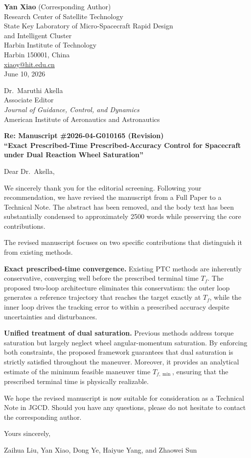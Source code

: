 \documentclass[12pt]{article}
\begin{document}
\begin{flushright}
\textbf{Yan Xiao} (Corresponding Author)\\
Research Center of Satellite Technology\\
State Key Laboratory of Micro-Spacecraft Rapid Design\\
and Intelligent Cluster\\
Harbin Institute of Technology\\
Harbin 150001, China\\
\href{mailto:xiaoy@hit.edu.cn}{xiaoy@hit.edu.cn}\\[6pt]
June 10, 2026
\end{flushright}

\bigskip

Dr.\ Maruthi Akella\\
Associate Editor\\
\textit{Journal of Guidance, Control, and Dynamics}\\
American Institute of Aeronautics and Astronautics

\bigskip

\textbf{Re: Manuscript \#2026-04-G010165 (Revision)}\\[4pt]
\textbf{``Exact Prescribed-Time Prescribed-Accuracy Control for Spacecraft
under Dual Reaction Wheel Saturation''}

\bigskip

Dear Dr.\ Akella,

We sincerely thank you for the editorial screening. Following your
recommendation, we have revised the manuscript from a Full Paper to a
Technical Note. The abstract has been removed, and the body text has been
substantially condensed to approximately 2500 words while preserving the core
contributions.

The revised manuscript focuses on two specific contributions that distinguish
it from existing methods.

\textbf{Exact prescribed-time convergence.}
Existing PTC methods are inherently conservative, converging well before the
prescribed terminal time $T_f$. The proposed two-loop architecture eliminates
this conservatism: the outer loop generates a reference trajectory that reaches
the target exactly at $T_f$, while the inner loop drives the tracking error to
within a prescribed accuracy despite uncertainties and disturbances.

\textbf{Unified treatment of dual saturation.}
Previous methods address torque saturation but largely neglect wheel
angular-momentum saturation. By enforcing both constraints,
the proposed framework guarantees that dual saturation is strictly satisfied
throughout the maneuver. Moreover, it provides an analytical estimate of the
minimum feasible maneuver time $T_{f,\min}$, ensuring that the prescribed
terminal time is physically realizable.

We hope the revised manuscript is now suitable for consideration as a
Technical Note in JGCD. Should you have any questions, please do not hesitate
to contact the corresponding author.

Yours sincerely,

\bigskip\bigskip

Zaihua Liu, Yan Xiao, Dong Ye, Haiyue Yang, and Zhaowei Sun
\end{document}
